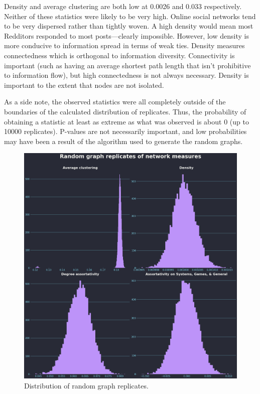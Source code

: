 \documentclass[12pt, a4paper]{article}
\begin{document}
Density and average clustering are both low at 0.0026 and 0.033 respectively. Neither of these statistics were likely to be very high. Online social networks tend to be very dispersed rather than tightly woven. A high density would mean most Redditors responded to most posts---clearly impossible. However, low density is more conducive to information spread in terms of weak ties. Density measures connectedness which is orthogonal to information diversity. Connectivity is important (such as having an average shortest path length that isn't prohibitive to information flow), but high connectedness is not always necessary. Density is important to the extent that nodes are not isolated.

As a side note, the observed statistics were all completely outside of the boundaries of the calculated distribution of replicates. Thus, the probability of obtaining a statistic at least as extreme as what was observed is about 0 (up to 10000 replicates). P-values are not necessarily important, and low probabilities may have been a result of the algorithm used to generate the random graphs.

\begin{figure}[ht!]
  \centering
  \includegraphics[width=\textwidth]{metrics_dist.png}
  \caption{Distribution of random graph replicates.}
  \label{fig:metricsdist}
\end{figure}
\end{document}

